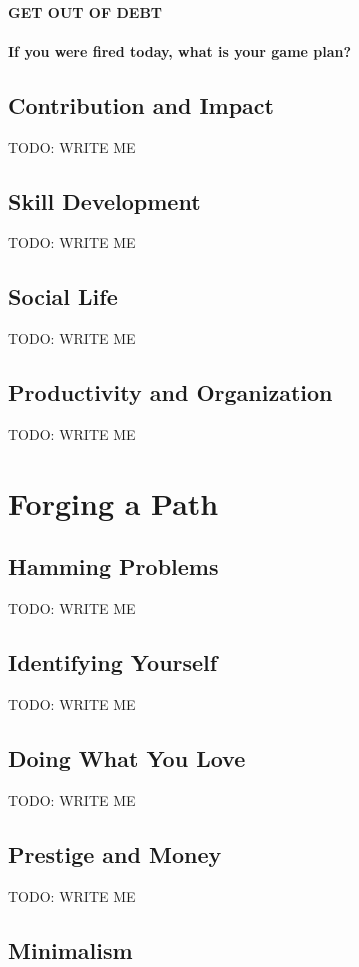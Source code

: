 \documentclass[]{book}
\newcommand{\TOWRITE}{TODO: WRITE ME}
\begin{document}
\subsection{GET OUT OF DEBT}
\subsection{If you were fired today, what is your game plan?}

\chapter{Contribution and Impact}
\TOWRITE

\chapter{Skill Development}
\TOWRITE

\chapter{Social Life}
\TOWRITE

\chapter{Productivity and Organization}
\TOWRITE


\part{Forging a Path}

\chapter{Hamming Problems}
\TOWRITE

\chapter{Identifying Yourself}
\TOWRITE

\chapter{Doing What You Love}
\TOWRITE

\chapter{Prestige and Money}
\TOWRITE

\chapter{Minimalism}
\end{document}
